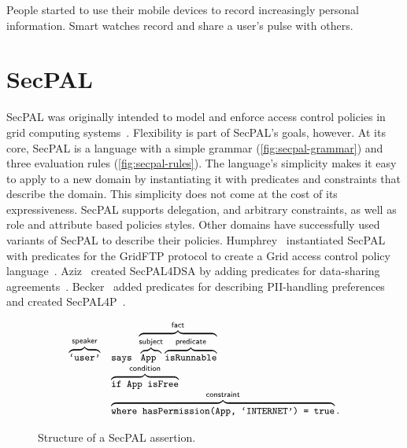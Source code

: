 \documentclass[thesis.tex]{subfiles}
\begin{document}
People started to use their mobile devices to record increasingly personal information.
Smart watches record and share a user's pulse with others.

\section{SecPAL}

SecPAL was originally intended to model and enforce access control
policies in grid computing
systems~\cite{becker_secpal:_2010}. Flexibility is part of SecPAL's
goals, however. At its core, SecPAL is a language with a simple
grammar (\autoref{fig:secpal-grammar}) and three evaluation rules
(\autoref{fig:secpal-rules}). The language's simplicity makes it easy
to apply to a new domain by instantiating it with predicates and
constraints that describe the domain. This simplicity does not come at
the cost of its expressiveness. SecPAL supports delegation, and
arbitrary constraints, as well as role and attribute based policies
styles. Other domains have successfully used variants of SecPAL to
describe their policies. Humphrey~\etal{} instantiated SecPAL with
predicates for the GridFTP protocol to create a Grid access control
policy language~\cite{humphrey_fine-grained_2007}. Aziz~\etal{}
created SecPAL4DSA by adding predicates for data-sharing
agreements~\cite{aziz_secpal4dsa:_2011}.  Becker~\etal{} added
predicates for describing \ac{PII}-handling preferences and created
SecPAL4P~\cite{becker_framework_2009}.

\begin{figure}
  \newcommand{\bracetext}[1]{\text{\sffamily #1}}
  \newcommand{\smalltext}[1]{\text{\ttfamily\small #1}}
  \centering
    \begin{equation*}
      \begin{array}{r l}
        \overbrace{\smalltext{`user'}}^{\bracetext{speaker}} &
        \smalltext{ says }\overbrace{\overbrace{\smalltext{ App }}^{\bracetext{subject}}\overbrace{\smalltext{ isRunnable}}^{\bracetext{predicate}}}^{\bracetext{fact}} \\
        & \overbrace{\smalltext{ if App isFree}}^{\bracetext{condition}} \\
        & \overbrace{\smalltext{ where hasPermission(App, `INTERNET') = true}}^{\bracetext{constraint}}.
      \end{array}
    \end{equation*}
  \caption{Structure of a SecPAL assertion.}
  \label{fig:assertion}
\end{figure}
\end{document}
